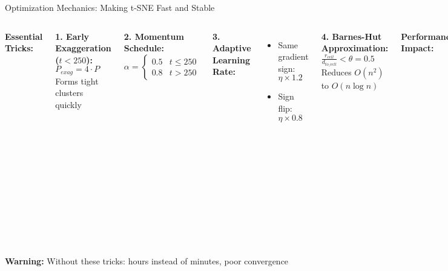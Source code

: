 \documentclass[aspectratio=169]{beamer}
\newcommand{\warning}[1]{\colorbox{red!10}{\textcolor{warningcolor}{\textbf{Warning:} #1}}}
\begin{document}
\begin{frame}{Optimization Mechanics: Making t-SNE Fast and Stable}
\begin{columns}
\textbf{Essential Tricks:}

\textbf{1. Early Exaggeration ($t < 250$):}
$P_{exag} = 4 \cdot P$
Forms tight clusters quickly

\textbf{2. Momentum Schedule:}
$\alpha = \begin{cases} 
0.5 & t \leq 250\\
0.8 & t > 250
\end{cases}$

\textbf{3. Adaptive Learning Rate:}
\begin{itemize}
\item Same gradient sign: $\eta \times 1.2$
\item Sign flip: $\eta \times 0.8$
\end{itemize}

\textbf{4. Barnes-Hut Approximation:}
$\frac{r_{cell}}{d_{to\_cell}} < \theta = 0.5$
Reduces $O(n^2)$ to $O(n\log n)$


\vspace{0.2cm}
\textbf{Performance Impact:}
\begin{itemize}
\item Early exag: 3× faster convergence
\item Momentum: Escapes local minima
\item Adaptive $\eta$: Prevents oscillation
\item Barnes-Hut: 50× speedup (n>10K)
\end{itemize}
\end{columns}

\vspace{0.3cm}
\warning{Without these tricks: hours instead of minutes, poor convergence}
\end{frame}
\end{document}
